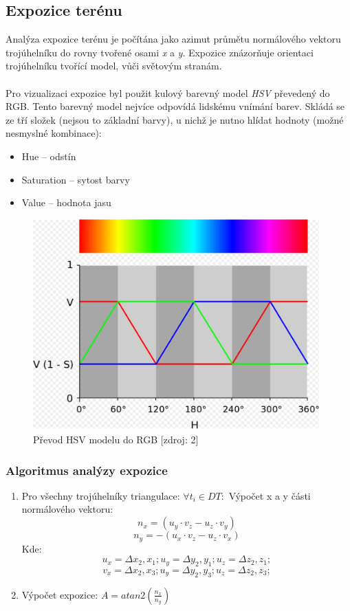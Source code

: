 \documentclass[a4paper, 12pt]{article}
\begin{document}
\subsection{Expozice terénu}
Analýza expozice terénu je počítána jako azimut průmětu normálového vektoru trojúhelníku do rovny tvořené osami \textit{x} a \textit{y}. Expozice znázorňuje orientaci trojúhelníku tvořící model, vůči světovým stranám.\\
\\
Pro vizualizaci expozice byl použit kulový barevný model \textit{HSV} převedený do RGB. Tento barevný model nejvíce odpovídá lidskému vnímání barev. Skládá se ze tří složek (nejsou to základní barvy), u nichž je nutno hlídat hodnoty (možné nesmyslné kombinace):
\begin{itemize}
\item Hue – odstín
\item Saturation – sytost barvy
\item Value – hodnota jasu
\end{itemize}

\begin{figure}[h!]
	\centering
	\includegraphics[width=11cm]{HSV.jpg}
	\caption{Převod HSV modelu do RGB [zdroj: 2]}
\end{figure}

\subsubsection{Algoritmus analýzy expozice}
\begin{enumerate}
\item Pro všechny trojúhelníky triangulace: $ \forall t_i \in DT: $
\subitem Výpočet x a y části normálového vektoru: \\
$$ n_x = (u_y \cdot v_z - u_z \cdot v_y) $$
$$ n_y = -(u_x \cdot v_z - u_z \cdot v_x) $$
\subitem Kde:
$$  u_x = \Delta x_2, x_1; u_y = \Delta y_2, y_1; u_z = \Delta z_2, z_1;$$
$$  v_x = \Delta x_2, x_3; u_y = \Delta y_2, y_3; u_z = \Delta z_2, z_3;$$
\item Výpočet expozice: $ A =atan2( \frac{n_x}{n_y}) $
\end{enumerate}
\end{document}
